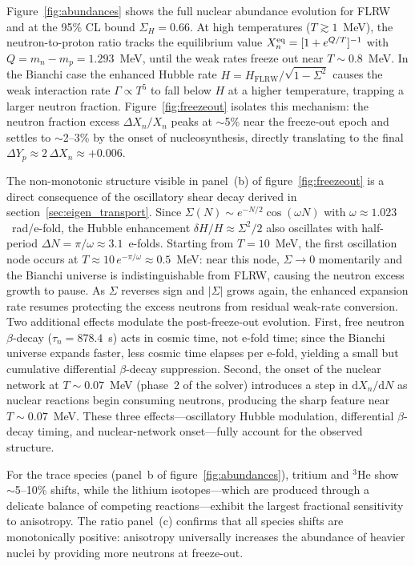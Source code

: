 \documentclass[a4paper,11pt]{article}
\newcommand{\Sig}{\Sigma}
\newcommand{\SigH}{\Sigma_H}
\newcommand{\Yp}{Y_p}
\newcommand{\FLRW}{\mathrm{FLRW}}
\newcommand{\dd}{\mathrm{d}}
\begin{document}
Figure~\ref{fig:abundances} shows the full nuclear abundance evolution for FLRW and at the 95\% CL bound $\SigH = 0.66$.  At high temperatures ($T \gtrsim 1$~MeV), the neutron-to-proton ratio tracks the equilibrium value $X_n^{\rm eq} = [1 + e^{Q/T}]^{-1}$ with $Q = m_n - m_p = 1.293$~MeV, until the weak rates freeze out near $T \sim 0.8$~MeV.  In the Bianchi case the enhanced Hubble rate $H = H_\FLRW/\sqrt{1-\Sig^2}$ causes the weak interaction rate $\Gamma \propto T^5$ to fall below $H$ at a higher temperature, trapping a larger neutron fraction.  Figure~\ref{fig:freezeout} isolates this mechanism: the neutron fraction excess $\Delta X_n / X_n$ peaks at $\sim$5\% near the freeze-out epoch and settles to $\sim$2--3\% by the onset of nucleosynthesis, directly translating to the final $\Delta\Yp \approx 2\,\Delta X_n \approx +0.006$.

The non-monotonic structure visible in panel~(b) of figure~\ref{fig:freezeout} is a direct consequence of the oscillatory shear decay derived in section~\ref{sec:eigen_transport}.  Since $\Sig(N) \sim e^{-N/2}\cos(\omega N)$ with $\omega \approx 1.023$~rad/e-fold, the Hubble enhancement $\delta H/H \approx \Sig^2/2$ also oscillates with half-period $\Delta N = \pi/\omega \approx 3.1$~e-folds.  Starting from $T = 10$~MeV, the first oscillation node occurs at $T \approx 10\,e^{-\pi/\omega} \approx 0.5$~MeV: near this node, $\Sig \to 0$ momentarily and the Bianchi universe is indistinguishable from FLRW, causing the neutron excess growth to pause.  As $\Sig$ reverses sign and $|\Sig|$ grows again, the enhanced expansion rate resumes protecting the excess neutrons from residual weak-rate conversion.  Two additional effects modulate the post-freeze-out evolution.  First, free neutron $\beta$-decay ($\tau_n = 878.4$~s) acts in cosmic time, not e-fold time; since the Bianchi universe expands faster, less cosmic time elapses per e-fold, yielding a small but cumulative differential $\beta$-decay suppression.  Second, the onset of the nuclear network at $T \sim 0.07$~MeV (phase~2 of the solver) introduces a step in $\dd X_n/\dd N$ as nuclear reactions begin consuming neutrons, producing the sharp feature near $T \sim 0.07$~MeV.  These three effects---oscillatory Hubble modulation, differential $\beta$-decay timing, and nuclear-network onset---fully account for the observed structure.

For the trace species (panel~b of figure~\ref{fig:abundances}), tritium and $^3$He show $\sim$5--10\% shifts, while the lithium isotopes---which are produced through a delicate balance of competing reactions---exhibit the largest fractional sensitivity to anisotropy.  The ratio panel~(c) confirms that all species shifts are monotonically positive: anisotropy universally increases the abundance of heavier nuclei by providing more neutrons at freeze-out.
\end{document}
